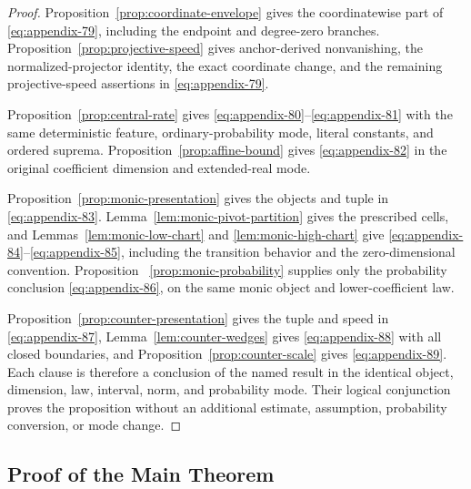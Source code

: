 \begin{proof}
Proposition~\ref{prop:coordinate-envelope} gives the coordinatewise part of
\eqref{eq:appendix-79}, including the endpoint and degree-zero branches.
Proposition~\ref{prop:projective-speed} gives anchor-derived nonvanishing,
the normalized-projector identity, the exact coordinate change, and the
remaining projective-speed assertions in \eqref{eq:appendix-79}.

Proposition~\ref{prop:central-rate} gives \eqref{eq:appendix-80}--\eqref{eq:appendix-81} with the same
deterministic feature, ordinary-probability mode, literal constants, and
ordered suprema.  Proposition~\ref{prop:affine-bound} gives \eqref{eq:appendix-82} in the
original coefficient dimension and extended-real mode.

Proposition~\ref{prop:monic-presentation} gives the objects and tuple in
\eqref{eq:appendix-83}.  Lemma~\ref{lem:monic-pivot-partition} gives the prescribed cells,
and Lemmas~\ref{lem:monic-low-chart} and
\ref{lem:monic-high-chart} give \eqref{eq:appendix-84}--\eqref{eq:appendix-85}, including the transition
behavior and the zero-dimensional convention.  Proposition
~\ref{prop:monic-probability} supplies only the probability conclusion
\eqref{eq:appendix-86}, on the same monic object and lower-coefficient law.

Proposition~\ref{prop:counter-presentation} gives the tuple and speed in
\eqref{eq:appendix-87}, Lemma~\ref{lem:counter-wedges} gives \eqref{eq:appendix-88} with all closed
boundaries, and Proposition~\ref{prop:counter-scale} gives \eqref{eq:appendix-89}.  Each
clause is therefore a conclusion of the named result in the identical
object, dimension, law, interval, norm, and probability mode.  Their logical
conjunction proves the proposition without an additional estimate,
assumption, probability conversion, or mode change.
\end{proof}

\subsection{Proof of the Main Theorem}

